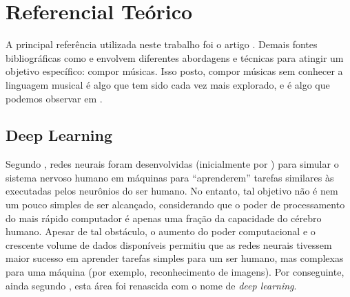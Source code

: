 \documentclass{automatextcc}
\begin{document}



\newpage
\section{Referencial Teórico}



A principal referência utilizada neste trabalho foi o artigo \cite{agarwala2017music}. Demais fontes bibliográficas como \cite{da2017modelagem} e \cite{de2018deep} envolvem diferentes abordagens e técnicas para atingir um objetivo específico: compor músicas. Isso posto, compor músicas sem conhecer a linguagem musical é algo que tem sido cada vez mais explorado, e é algo que podemos observar em \cite{agarwala2017music}.

\subsection{Deep Learning}
Segundo \cite{aggarwal2018DeepLearning}, redes neurais foram desenvolvidas (inicialmente por \cite{neural1943}) para simular o sistema nervoso humano em máquinas para ``aprenderem'' tarefas similares às executadas pelos neurônios do ser humano. No entanto, tal objetivo não é nem um pouco simples de ser alcançado, considerando que o poder de processamento do mais rápido computador é apenas uma fração da capacidade do cérebro humano. Apesar de tal obstáculo, o aumento do poder computacional e o crescente volume de dados disponíveis permitiu que as redes neurais tivessem maior sucesso em aprender tarefas simples para um ser humano, mas complexas para uma máquina (por exemplo, reconhecimento de imagens). Por conseguinte, ainda segundo \cite{aggarwal2018DeepLearning}, esta área foi renascida com o nome de \textit{deep learning}. 
\end{document}
